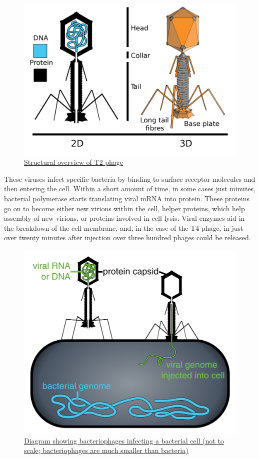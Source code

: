 \begin{figure}

{\centering \includegraphics[width=0.7\linewidth]{./figures/bacteria/Tevenphage} 

}

\caption{\href{https://en.wikipedia.org/wiki/Hershey–Chase_experiment\#/media/File:Tevenphage.svg}{Structural overview of T2 phage}}\label{fig:phage}
\end{figure}

These viruses infect specific bacteria by binding to surface receptor molecules and then entering the cell. Within a short amount of time, in some cases just minutes, bacterial polymerase starts translating viral mRNA into protein. These proteins go on to become either new virions within the cell, helper proteins, which help assembly of new virions, or proteins involved in cell lysis. Viral enzymes aid in the breakdown of the cell membrane, and, in the case of the T4 phage, in just over twenty minutes after injection over three hundred phages could be released.



\begin{figure}

{\centering \includegraphics[width=0.7\linewidth]{./figures/bacteria/Phage_injecting_its_genome_into_bacteria} 

}

\caption{\href{https://commons.wikimedia.org/wiki/File:Phage_injecting_its_genome_into_bacteria.svg}{Diagram showing bacteriophages infecting a bacterial cell (not to scale; bacteriophages are much smaller than bacteria)}}\label{fig:bacphage}
\end{figure}


